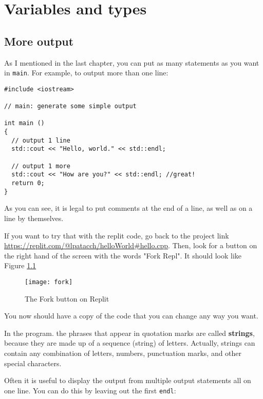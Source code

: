

\chapter{Variables and types}

\section{More output}

As I mentioned in the last chapter, you can put as many statements as
you want in {\tt main}.  For example, to output more than one line:

\begin{lstlisting}[frame=single]
#include <iostream>

// main: generate some simple output

int main ()
{
  // output 1 line
  std::cout << "Hello, world." << std::endl; 
  
  // output 1 more
  std::cout << "How are you?" << std::endl; //great!  
  return 0;
}
\end{lstlisting}

As you can see, it is legal to put comments at the
end of a line, as well as on a line by themselves.

If you want to try that with the replit code, go back to the project link 
\url{https://replit.com/@lpatacch/helloWorld#hello.cpp}. Then, look for a button on the right hand of the screen with the words "Fork Repl". It should look like Figure \ref{fig:fork}
\begin{figure}
    \centering
    \texttt{[image: fork]}
    \caption{The Fork button on Replit}
    \label{fig:fork}
\end{figure}
You now should have a copy of the code that you can change any way you want.


In the program. the phrases that appear in quotation marks are called {\bf strings},
because they are made up of a sequence (string) of letters.  Actually,
strings can contain any combination of letters, numbers, punctuation
marks, and other special characters.


Often it is useful to display the output from multiple output
statements all on one line.  You can do this by leaving out
the first {\tt endl}:

